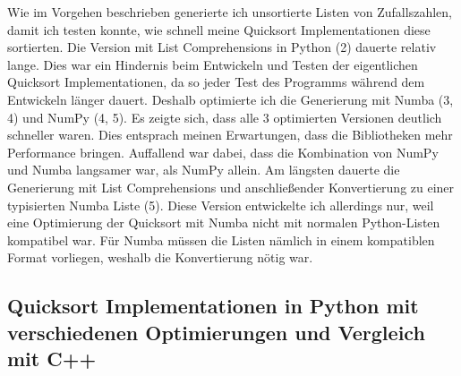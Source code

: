 \documentclass[11pt,a4paper]{article}
\begin{document}
Wie im Vorgehen beschrieben generierte ich unsortierte Listen von Zufallszahlen,
damit ich testen konnte, wie schnell meine Quicksort Implementationen diese
sortierten. Die Version mit List Comprehensions in Python (2) dauerte relativ lange.
Dies war ein Hindernis beim Entwickeln und Testen der eigentlichen Quicksort Implementationen,
da so jeder Test des Programms während dem Entwickeln länger dauert.
Deshalb optimierte ich die Generierung mit Numba (3, 4) und NumPy (4, 5).
Es zeigte sich, dass alle 3 optimierten Versionen deutlich schneller waren.
Dies entsprach meinen Erwartungen, dass die Bibliotheken mehr Performance bringen.
Auffallend war dabei, dass die Kombination von NumPy und Numba langsamer war,
als NumPy allein.
Am längsten dauerte die Generierung mit List Comprehensions und anschließender
Konvertierung zu einer typisierten Numba Liste (5). Diese Version entwickelte
ich allerdings nur, weil eine Optimierung der Quicksort mit Numba nicht mit normalen Python-Listen
kompatibel war. Für Numba müssen die Listen nämlich in einem kompatiblen Format vorliegen,
weshalb die Konvertierung nötig war.

\subsection{Quicksort Implementationen in Python mit verschiedenen Optimierungen und Vergleich mit C++}

\begin{bchart}[min=0, max=80, scale=1.9]
    \smallskip
    \smallskip
    \smallskip
    \smallskip
    \smallskip
    \smallskip
    \smallskip
    \smallskip
    \smallskip
    \smallskip
    \smallskip
    \smallskip
\end{bchart}
\end{document}
